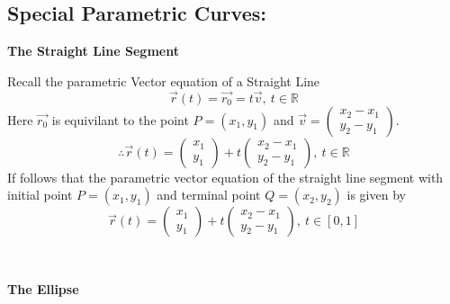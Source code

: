 \documentclass[14pt]{article}
\begin{document}
    \subsection{Special Parametric Curves:}
    \textbf{The Straight Line Segment}
    \begin{multicols}{2}
        Recall the parametric Vector equation of a Straight Line 
        $$\vec r (t)=\vec{r_0}=t\vec v,\ t\in\mathbb{R}$$
        Here $\vec{r_0}$ is equivilant to the point $P=(x_1,y_1)$ and $\vec v=\begin{pmatrix} x_2-x_1\\y_2-y_1\end{pmatrix}$.
        $$\therefore \vec r(t)=\begin{pmatrix}x_1\\ y_1\end{pmatrix}+t\begin{pmatrix}x_2-x_1\\y_2-y_1\end{pmatrix},\ t\in\mathbb{R}$$
        If follows that the parametric vector equation of the straight line segment with initial point $P=(x_1,y_1)$ and terminal point $Q=(x_2, y_2)$ is given by
        $$\vec r(t)=\begin{pmatrix}x_1\\ y_1\end{pmatrix}+t\begin{pmatrix}x_2-x_1\\y_2-y_1\end{pmatrix},\ t\in[0,1]$$
        \\
    \end{multicols}   
    \textbf{The Ellipse}
\end{document}
